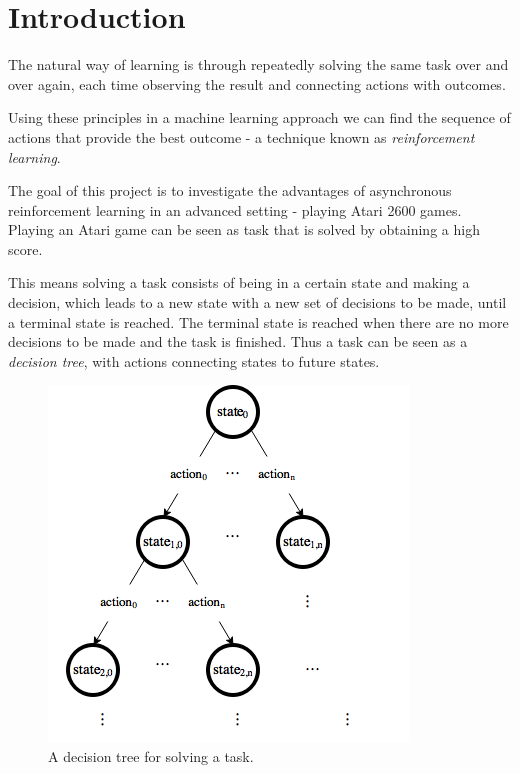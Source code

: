 \documentclass[11pt]{article}
\begin{document}
\maketitle

\section{Introduction}

The natural way of learning is through repeatedly solving the same
task over and over again, each time observing the result and connecting
actions with outcomes.

Using these principles in a machine learning approach
we can find the sequence of actions that provide the best outcome - a technique known as
\textit{reinforcement learning}.

The goal of this project is to investigate the advantages of asynchronous reinforcement
learning in an advanced setting - playing Atari 2600 games\cite{openAIEnvs}.
Playing an Atari game can be seen as task that is solved by obtaining 
a high score.

This means solving a task consists of being in a certain state and making a decision,
which leads to a new state with a new set of decisions to be made, until
a terminal state is reached.
The terminal state is reached when there are no more decisions to be made
and the task is finished.
Thus a task can be seen as a \textit{decision tree}, with actions connecting states to future states.
\begin{figure}[H]
    \centering
    \includegraphics[scale=0.5]{include/decision_tree.png}
    \caption{A decision tree for solving a task.}
    \label{fig:dec_tree}
\end{figure}
\end{document}
